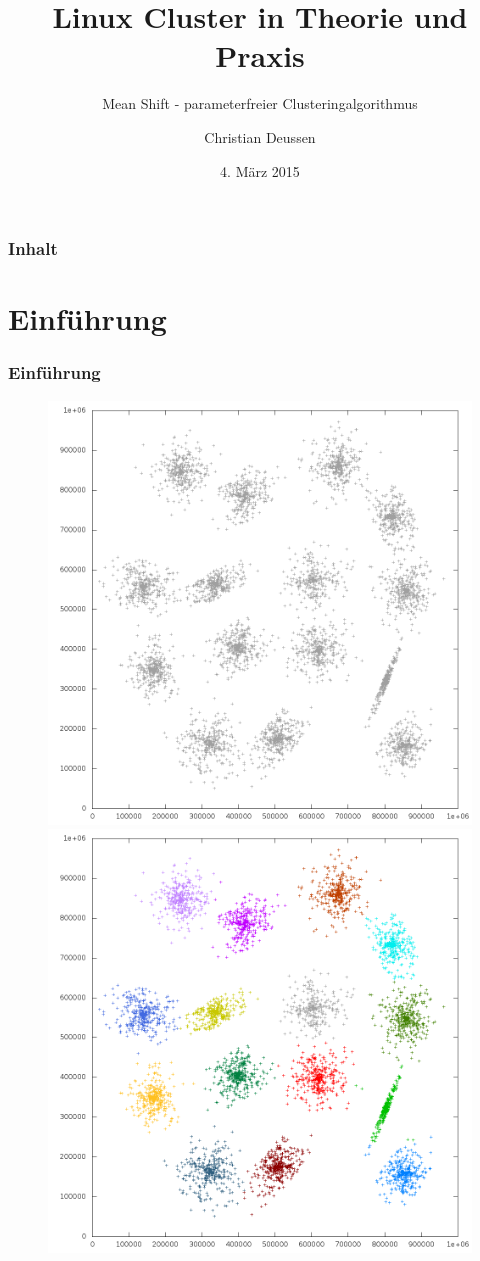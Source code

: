 \documentclass[10pt,utf8]{beamer}
\title{Linux Cluster in Theorie und Praxis}
\subtitle{Mean Shift - parameterfreier Clusteringalgorithmus}
\author{Christian Deussen}
\date{4. M\"arz 2015}
\institute[ZIH TUD]{Zentrum f\"ur Informationsdienste und Hochleistungsrechnen -- TU Dresden}
\begin{document}
\zihmaketitle

\begin{frame}
\frametitle{Inhalt}
	\tableofcontents
\end{frame}
\Large

\section{Einführung}
\begin{frame}
	\frametitle{Einf\"uhrung}
		\centering
		\begin{figure}[p!]
			\vspace{-10pt}
			\hspace{-25pt}
			\includegraphics[scale=0.23, keepaspectratio]{../output/pics/s1_black.png}
			\includegraphics[scale=0.23, keepaspectratio]{../output/pics/s1_colored.png}

\end{figure}
\end{frame}
\end{document}
